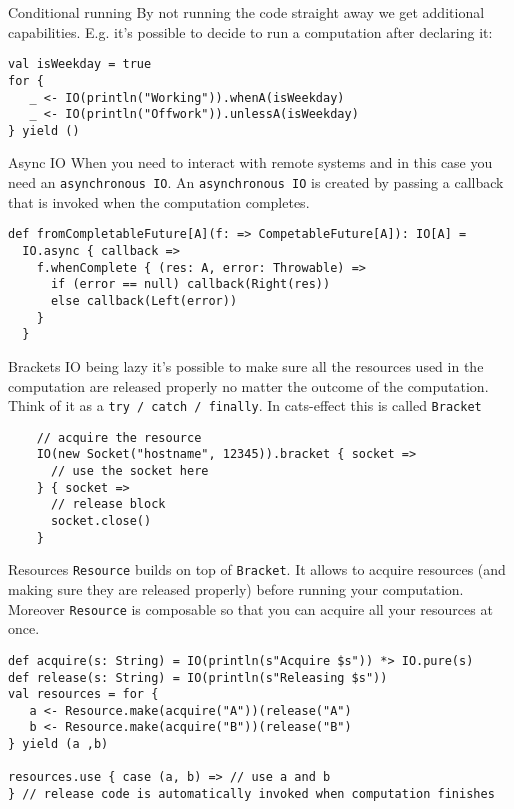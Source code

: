 \documentclass[aspectratio=169]{beamer}
\begin{document}
\begin{frame}[fragile]{Conditional running}
By not running the code straight away we get additional capabilities. E.g. it’s possible to decide
to run a computation after declaring it:
\bigskip
\begin{verbatim}
val isWeekday = true
for {
   _ <- IO(println("Working")).whenA(isWeekday)
   _ <- IO(println("Offwork")).unlessA(isWeekday)
} yield ()
\end{verbatim}
\end{frame}

\begin{frame}[fragile]{Async IO}
When you need to interact with remote systems and in this case you need an \texttt{asynchronous IO}.
An \texttt{asynchronous IO} is created by passing a callback that is invoked when the computation completes.
\bigskip
\begin{verbatim}
def fromCompletableFuture[A](f: => CompetableFuture[A]): IO[A] =
  IO.async { callback =>
    f.whenComplete { (res: A, error: Throwable) =>
      if (error == null) callback(Right(res))
      else callback(Left(error))
    } 
  }
\end{verbatim}
\end{frame}

\begin{frame}[fragile]{Brackets}
  IO being lazy it’s possible to make sure all the resources used in the computation are released
  properly no matter the outcome of the computation. Think of it as a \texttt{try~/~catch~/~finally}.
  In cats-effect this is called \texttt{Bracket}
  \bigskip
  \begin{verbatim}
    // acquire the resource
    IO(new Socket("hostname", 12345)).bracket { socket =>
      // use the socket here
    } { socket =>
      // release block
      socket.close()
    }
  \end{verbatim}
\end{frame}

\begin{frame}[fragile]{Resources}
  \texttt{Resource} builds on top of \texttt{Bracket}. It allows to acquire resources (and making sure they are
  released properly) before running your computation. Moreover \texttt{Resource} is composable so that you
  can acquire all your resources at once.
  \begin{verbatim}
def acquire(s: String) = IO(println(s"Acquire $s")) *> IO.pure(s)
def release(s: String) = IO(println(s"Releasing $s"))
val resources = for {
   a <- Resource.make(acquire("A"))(release("A")
   b <- Resource.make(acquire("B"))(release("B")
} yield (a ,b)

resources.use { case (a, b) => // use a and b
} // release code is automatically invoked when computation finishes
  \end{verbatim}
\end{frame}
\end{document}

